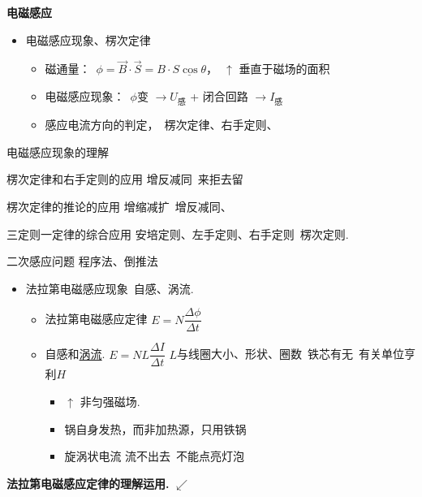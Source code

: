 \textbf{电磁感应}

\begin{itemize}
\item 电磁感应现象、楞次定律
 \begin{itemize}
 \item 磁通量：\ $\phi=\vec B\cdot\vec S=B\cdot\underline{S\cos\theta}$，\ $\uparrow$ 垂直于磁场的面积
 \item 电磁感应现象：\ $\phi$变 $\to U_{\text{感}}$ + 闭合回路 $\to I_{\text{感}}$
 \item 感应电流方向的判定，\ 楞次定律、右手定则、
 \end{itemize}
\end{itemize}

电磁感应现象的理解

楞次定律和右手定则的应用 \quad 增反减同\ 来拒去留

楞次定律的推论的应用 \quad 增缩减扩\ 增反减同、

三定则一定律的综合应用 \quad 安培定则、左手定则、右手定则\ 楞次定则.

二次感应问题 \quad 程序法、倒推法
\begin{itemize}
\item 法拉第电磁感应现象\ 自感、涡流.
 \begin{itemize}
 \item 法拉第电磁感应定律 \quad $E=N\dfrac{\Delta\phi}{\Delta t}$
 \item 自感和\underline{涡流}. \quad $E=NL\dfrac{\Delta I}{\Delta t}$ \quad $L$与线圈大小、形状、圈数\ 铁芯有无\ 有关\quad 单位亨利$H$
 \begin{itemize}
 \item $\uparrow$ 非匀强磁场.
 \item 锅自身发热，而非加热源，只用铁锅
 \item 旋涡状电流 流不出去\ 不能点亮灯泡
 \end{itemize}
 \end{itemize}
\end{itemize}
\textbf{法拉第电磁感应定律的理解运用.} $\swarrow$

